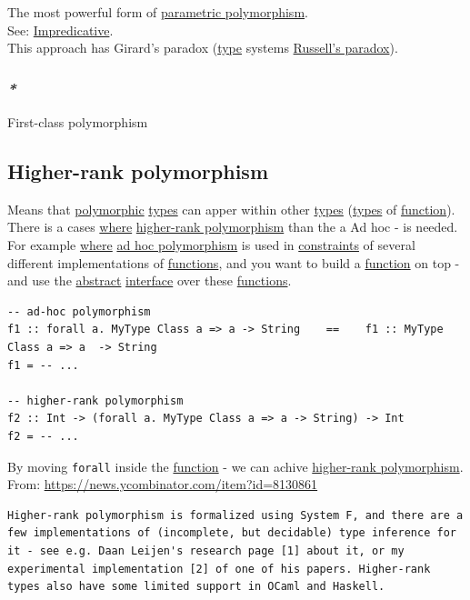 \documentclass[a4paper,14pt,oneside]{book}
\begin{document}
The most powerful form of \hyperref[orgc265751]{parametric polymorphism}.\\
See: \hyperref[orge271475]{Impredicative}.\\

This approach has Girard's paradox (\hyperref[org6ce6dd7]{type} systems \hyperref[org809aff6]{Russell's paradox}).\\

\subsubsection{\emph{*}}
\label{sec:org11e77ec}

\label{orge0e56d1}First-class polymorphism\\

\subsection{\label{orgc9af927}Higher-rank polymorphism}
\label{sec:org0e75843}
Means that \hyperref[org115ca68]{polymorphic} \hyperref[orgc3d0384]{types} can apper within other \hyperref[orgc3d0384]{types} (\hyperref[orgc3d0384]{types} of \hyperref[org0850472]{function}).\\
There is a cases \hyperref[org1bc2474]{where} \hyperref[orgc9af927]{higher-rank polymorphism} than the a Ad hoc - is needed. For example \hyperref[org1bc2474]{where} \hyperref[org495d40d]{ad hoc polymorphism} is used in \hyperref[orgca54c5f]{constraints} of several different implementations of \hyperref[org0bc2540]{functions}, and you want to build a \hyperref[org0850472]{function} on top - and use the \hyperref[orgd7e9357]{abstract} \hyperref[org762f438]{interface} over these \hyperref[org0bc2540]{functions}.\\
\begin{verbatim}
-- ad-hoc polymorphism
f1 :: forall a. MyType Class a => a -> String    ==    f1 :: MyType Class a => a  -> String
f1 = -- ...

-- higher-rank polymorphism
f2 :: Int -> (forall a. MyType Class a => a -> String) -> Int
f2 = -- ...
\end{verbatim}
By moving \texttt{forall} inside the \hyperref[org0850472]{function} - we can achive \hyperref[orgc9af927]{higher-rank polymorphism}.\\

From: \url{https://news.ycombinator.com/item?id=8130861}\\
\begin{verbatim}
Higher-rank polymorphism is formalized using System F, and there are a few implementations of (incomplete, but decidable) type inference for it - see e.g. Daan Leijen's research page [1] about it, or my experimental implementation [2] of one of his papers. Higher-rank types also have some limited support in OCaml and Haskell.
\end{verbatim}
\end{document}
